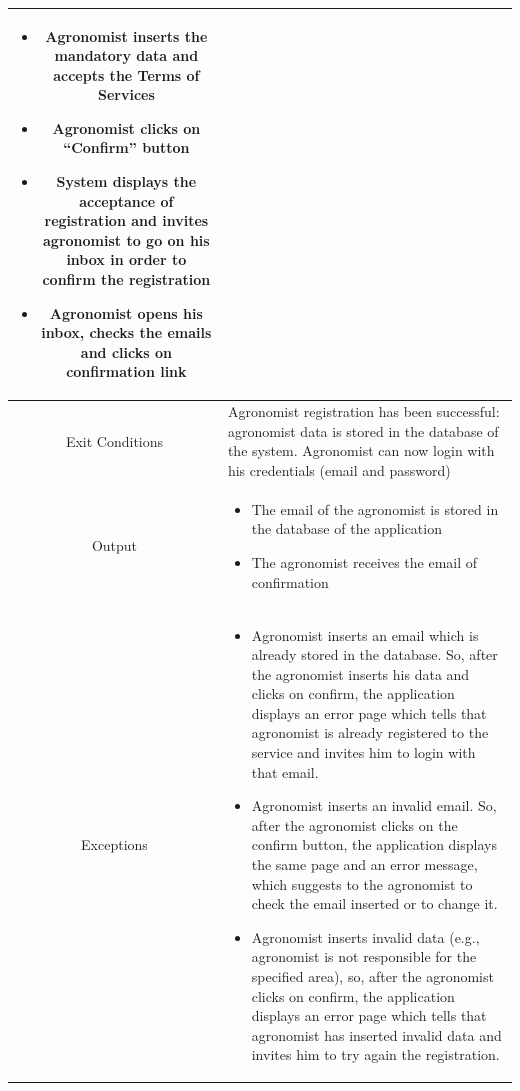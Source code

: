 \documentclass{article}
\begin{document}
\begin{center}
\begin{longtable}{|c| p{10cm}|}
\begin{itemize}
\begin{itemize}
                                            \item Email
                                            \item Password
                                            \item Responsible Area
                                        \end{itemize}
                                \item Agronomist inserts the mandatory data and accepts the Terms of Services
                                \item Agronomist clicks on “Confirm” button
                                \item System displays the acceptance of registration and invites agronomist to go on his inbox in order to confirm the registration
                                \item Agronomist opens his inbox, checks the emails and clicks on confirmation link
                            \end{itemize} \\
        \hline
            Exit Conditions & Agronomist registration has been successful: agronomist data is stored in the database of the system. 
                            Agronomist can now login with his credentials (email and password) \\
        \hline
            Output & \begin{itemize}
                        \item The email of the agronomist is stored in the database of the application
                        \item The agronomist receives the email of confirmation
                    \end{itemize}\\
        \hline
            Exceptions & \begin{itemize}
                            \item Agronomist inserts an email which is already stored in the database. So, after the agronomist inserts his data and clicks on confirm, the application displays an error page which tells that agronomist is already registered to the service and invites him to login with that email.
                            \item Agronomist inserts an invalid email. So, after the agronomist clicks on the confirm button, the application displays the same page and an error message, which suggests to the agronomist to check the email inserted or to change it.
                            \item Agronomist inserts invalid data (e.g., agronomist is not responsible for the specified area), so, after the agronomist clicks on confirm, the application displays an error page which tells that agronomist has inserted invalid data and invites him to try again the registration.
                        \end{itemize}\\
        \hline
    \end{longtable}
    

\end{center}
\end{document}
